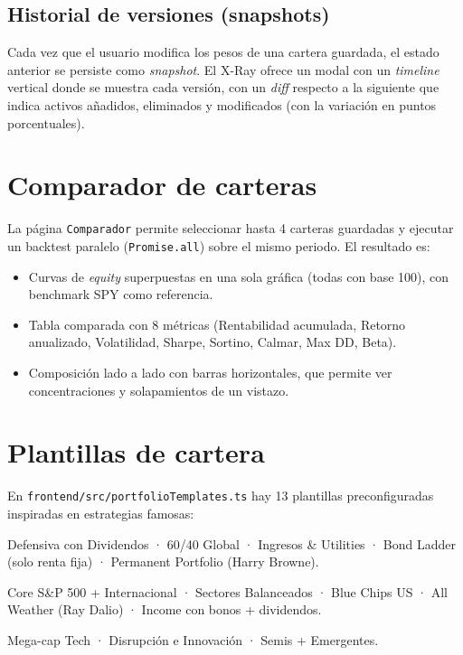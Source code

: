 \documentclass[11pt,a4paper]{article}
\begin{document}
\subsection{Historial de versiones (snapshots)}

Cada vez que el usuario modifica los pesos de una cartera guardada, el estado anterior se persiste como \textit{snapshot}. El X-Ray ofrece un modal con un \textit{timeline} vertical donde se muestra cada versión, con un \textit{diff} respecto a la siguiente que indica activos añadidos, eliminados y modificados (con la variación en puntos porcentuales).

\section{Comparador de carteras}

La página \texttt{Comparador} permite seleccionar hasta 4 carteras guardadas y ejecutar un backtest paralelo (\texttt{Promise.all}) sobre el mismo periodo. El resultado es:

\begin{itemize}
  \item Curvas de \textit{equity} superpuestas en una sola gráfica (todas con base 100), con benchmark SPY como referencia.
  \item Tabla comparada con 8 métricas (Rentabilidad acumulada, Retorno anualizado, Volatilidad, Sharpe, Sortino, Calmar, Max DD, Beta).
  \item Composición lado a lado con barras horizontales, que permite ver concentraciones y solapamientos de un vistazo.
\end{itemize}

\section{Plantillas de cartera}

En \texttt{frontend/src/portfolioTemplates.ts} hay 13 plantillas preconfiguradas inspiradas en estrategias famosas:

\begin{description}[leftmargin=2cm]
  \item[Conservadoras] Defensiva con Dividendos · 60/40 Global · Ingresos \& Utilities · Bond Ladder (solo renta fija) · Permanent Portfolio (Harry Browne).
  \item[Moderadas] Core S\&P 500 + Internacional · Sectores Balanceados · Blue Chips US · All Weather (Ray Dalio) · Income con bonos + dividendos.
  \item[Agresivas] Mega-cap Tech · Disrupción e Innovación · Semis + Emergentes.
\end{description}
\end{document}
